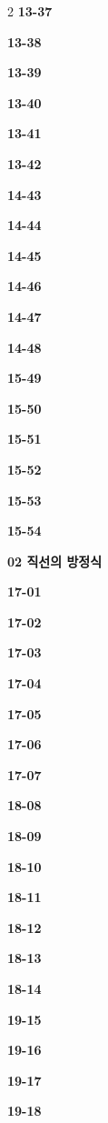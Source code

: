 \documentclass[10pt,a4paper]{article}
\begin{document}
\begin{multicols}{2}
\noindent\textbf{13-37}\ \par
\noindent\textbf{13-38}\ \par
\noindent\textbf{13-39}\ \par
\noindent\textbf{13-40}\ \par
\noindent\textbf{13-41}\ \par
\noindent\textbf{13-42}\ \par
\noindent\textbf{14-43}\ \par
\noindent\textbf{14-44}\ \par
\noindent\textbf{14-45}\ \par
\noindent\textbf{14-46}\ \par
\noindent\textbf{14-47}\ \par
\noindent\textbf{14-48}\ \par
\noindent\textbf{15-49}\ \par
\noindent\textbf{15-50}\ \par
\noindent\textbf{15-51}\ \par
\noindent\textbf{15-52}\ \par
\noindent\textbf{15-53}\ \par
\noindent\textbf{15-54}\ \par
\noindent\textbf{02 직선의 방정식}\par\smallskip
\noindent\textbf{17-01}\ \par
\noindent\textbf{17-02}\ \par
\noindent\textbf{17-03}\ \par
\noindent\textbf{17-04}\ \par
\noindent\textbf{17-05}\ \par
\noindent\textbf{17-06}\ \par
\noindent\textbf{17-07}\ \par
\noindent\textbf{18-08}\ \par
\noindent\textbf{18-09}\ \par
\noindent\textbf{18-10}\ \par
\noindent\textbf{18-11}\ \par
\noindent\textbf{18-12}\ \par
\noindent\textbf{18-13}\ \par
\noindent\textbf{18-14}\ \par
\noindent\textbf{19-15}\ \par
\noindent\textbf{19-16}\ \par
\noindent\textbf{19-17}\ \par
\noindent\textbf{19-18}\ \par

\end{multicols}
\end{document}
